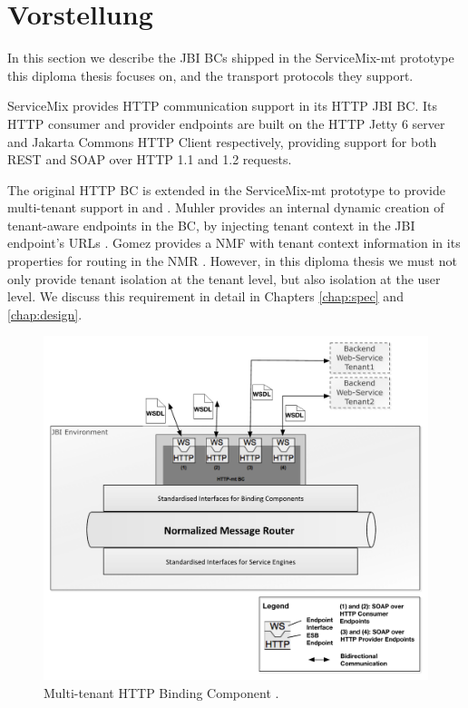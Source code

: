 \section{Vorstellung}
\label{sec:VorstellungBD4B}  

In this section we describe the \ac{JBI} \ac{BC}s shipped in the ServiceMix-mt prototype this diploma thesis focuses on, and the transport protocols they support. 



ServiceMix provides \ac{HTTP} communication support in its \ac{HTTP} \ac{JBI} \ac{BC}. Its \ac{HTTP} consumer and provider endpoints are built on the \ac{HTTP} Jetty 6 server and Jakarta Commons \ac{HTTP} Client respectively, providing support for both REST and SOAP over HTTP 1.1 and 1.2 requests.

The original \ac{HTTP} \ac{BC} is extended in the ServiceMix-mt prototype to provide multi-tenant support in \cite{Muhler2012} and \cite{gomez2012}. Muhler provides an internal dynamic creation of tenant-aware endpoints in the \ac{BC}, by injecting tenant context in the \ac{JBI} endpoint's URLs \cite{Muhler2012}. Gomez provides a \ac{NMF} with tenant context information in its properties for routing in the \ac{NMR} \cite{gomez2012}. However, in this diploma thesis we must not only provide tenant isolation at the tenant level, but also isolation at the user level. We discuss this requirement in detail in Chapters \ref{chap:spec} and \ref{chap:design}.

\begin{figure}[htb]
	\centering
		\includegraphics[clip, scale=0.3]{./gfx/httpmtbc.pdf}
	\caption[Multi-tenant HTTP Binding Component]{Multi-tenant HTTP Binding Component \cite{gomez2012}. }
	\label{fig:httpmt}
\end{figure}

